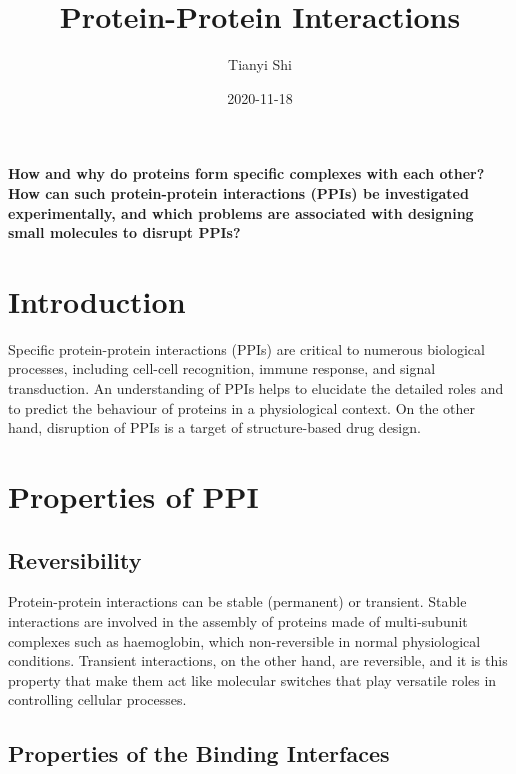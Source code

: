 \documentclass[
]{article}
\title{Protein-Protein Interactions}
\author{Tianyi Shi}
\date{2020-11-18}
\begin{document}
\maketitle

{
\setcounter{tocdepth}{2}
\tableofcontents
}
\textbf{How and why do proteins form specific complexes with each other? How can such protein-protein interactions (PPIs) be investigated experimentally, and which problems are associated with designing small molecules to disrupt PPIs?}

\hypertarget{introduction}{%
\section{Introduction}\label{introduction}}

Specific protein-protein interactions (PPIs) are critical to numerous biological processes, including cell-cell recognition, immune response, and signal transduction. An understanding of PPIs helps to elucidate the detailed roles and to predict the behaviour of proteins in a physiological context. On the other hand, disruption of PPIs is a target of structure-based drug design.

\hypertarget{properties-of-ppi}{%
\section{Properties of PPI}\label{properties-of-ppi}}

\hypertarget{reversibility}{%
\subsection{Reversibility}\label{reversibility}}

Protein-protein interactions can be stable (permanent) or transient. Stable interactions are involved in the assembly of proteins made of multi-subunit complexes such as haemoglobin, which non-reversible in normal physiological conditions. Transient interactions, on the other hand, are reversible, and it is this property that make them act like molecular switches that play versatile roles in controlling cellular processes.

\hypertarget{properties-of-the-binding-interfaces}{%
\subsection{Properties of the Binding Interfaces}\label{properties-of-the-binding-interfaces}}
\end{document}
